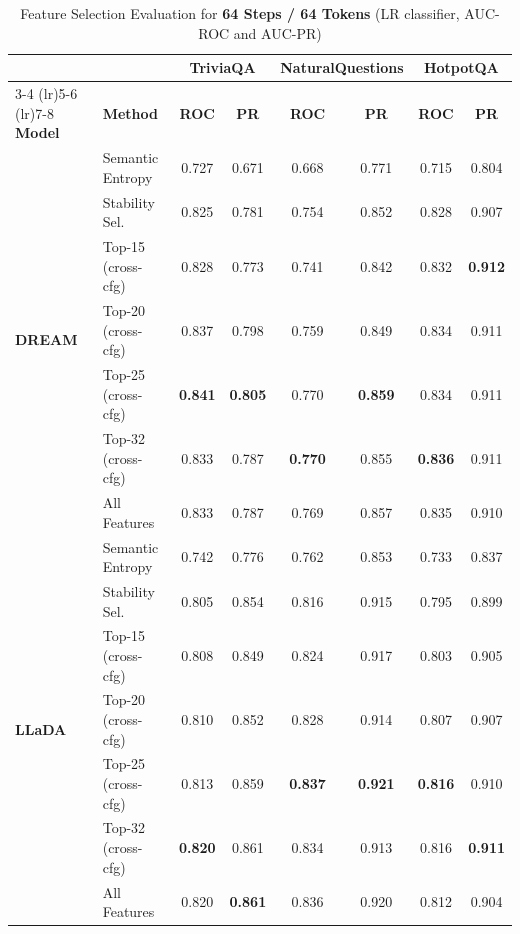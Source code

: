 \documentclass{article}
\begin{document}
\begin{table}[htbp]
\centering
\small
\caption{Feature Selection Evaluation for \textbf{64 Steps / 64 Tokens} (LR classifier, AUC-ROC and AUC-PR)}
\label{tab:fs_64steps_64tokens}
\begin{tabular}{llcccccc}
\toprule
 & & \multicolumn{2}{c}{\textbf{TriviaQA}} & \multicolumn{2}{c}{\textbf{NaturalQuestions}} & \multicolumn{2}{c}{\textbf{HotpotQA}} \\
\cmidrule(lr){3-4} \cmidrule(lr){5-6} \cmidrule(lr){7-8}
\textbf{Model} & \textbf{Method} & \textbf{ROC} & \textbf{PR} & \textbf{ROC} & \textbf{PR} & \textbf{ROC} & \textbf{PR} \\
\midrule
\multirow{7}{*}{\textbf{DREAM}}
 & Semantic Entropy & 0.727 & 0.671 & 0.668 & 0.771 & 0.715 & 0.804 \\
 \cmidrule(lr){2-8}
 & Stability Sel. & 0.825 & 0.781 & 0.754 & 0.852 & 0.828 & 0.907 \\
 & Top-15 (cross-cfg) & 0.828 & 0.773 & 0.741 & 0.842 & 0.832 & \textbf{0.912} \\
 & Top-20 (cross-cfg) & 0.837 & 0.798 & 0.759 & 0.849 & 0.834 & 0.911 \\
 & Top-25 (cross-cfg) & \textbf{0.841} & \textbf{0.805} & 0.770 & \textbf{0.859} & 0.834 & 0.911 \\
 & Top-32 (cross-cfg) & 0.833 & 0.787 & \textbf{0.770} & 0.855 & \textbf{0.836} & 0.911 \\
 & All Features & 0.833 & 0.787 & 0.769 & 0.857 & 0.835 & 0.910 \\
\midrule
\multirow{7}{*}{\textbf{LLaDA}}
 & Semantic Entropy & 0.742 & 0.776 & 0.762 & 0.853 & 0.733 & 0.837 \\
 \cmidrule(lr){2-8}
 & Stability Sel. & 0.805 & 0.854 & 0.816 & 0.915 & 0.795 & 0.899 \\
 & Top-15 (cross-cfg) & 0.808 & 0.849 & 0.824 & 0.917 & 0.803 & 0.905 \\
 & Top-20 (cross-cfg) & 0.810 & 0.852 & 0.828 & 0.914 & 0.807 & 0.907 \\
 & Top-25 (cross-cfg) & 0.813 & 0.859 & \textbf{0.837} & \textbf{0.921} & \textbf{0.816} & 0.910 \\
 & Top-32 (cross-cfg) & \textbf{0.820} & 0.861 & 0.834 & 0.913 & 0.816 & \textbf{0.911} \\
 & All Features & 0.820 & \textbf{0.861} & 0.836 & 0.920 & 0.812 & 0.904 \\
\bottomrule
\end{tabular}
\end{table}
\newpage
\end{document}

